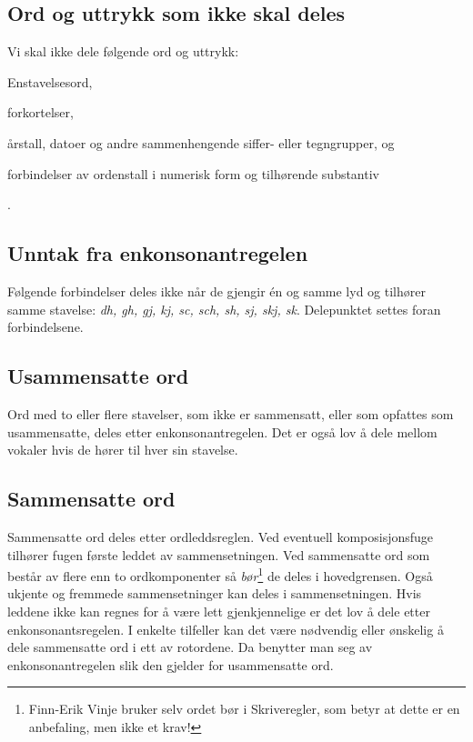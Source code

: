 \subsection{Ord og uttrykk som ikke skal deles}

Vi skal ikke dele følgende ord og uttrykk: 
\begin{inparaenum}
\item Enstavelsesord, 
\item forkortelser,
\item  årstall, datoer og andre sammenhengende siffer- eller tegngrupper, og
\item forbindelser av ordenstall i numerisk form og tilhørende substantiv
\end{inparaenum}.

	\newline
	\newline
	\newline

\subsection{Unntak fra enkonsonantregelen}
\label{sec:enkons-untak}

Følgende forbindelser deles ikke når de gjengir én og samme lyd og tilhører samme stavelse:	\textit{dh, gh, gj, kj, sc, sch, sh, sj, skj, sk}. Delepunktet settes foran forbindelsene.


\subsection{Usammensatte ord}

Ord med to eller flere stavelser, som ikke er sammensatt, eller som opfattes som usammensatte, deles etter enkonsonantregelen. Det er også lov å dele mellom vokaler hvis de hører til hver sin stavelse.

	\newline

\subsection{Sammensatte ord}

Sammensatte ord deles etter ordleddsreglen. Ved eventuell komposisjonsfuge tilhører fugen første leddet av sammensetningen. Ved sammensatte ord som består av flere enn to ordkomponenter så \textit{bør}\footnote{Finn-Erik Vinje bruker selv ordet bør i Skriveregler\cite{vinje}, som betyr at dette er en anbefaling, men ikke et krav!} de deles i hovedgrensen. Også ukjente og fremmede sammensetninger kan deles i sammensetningen. Hvis leddene ikke kan regnes for å være lett gjenkjennelige er det lov å dele etter enkonsonantsregelen. I enkelte tilfeller kan det være nødvendig eller ønskelig å dele sammensatte ord i ett av rotordene. Da benytter man seg av enkonsonantregelen slik den gjelder for usammensatte ord.

